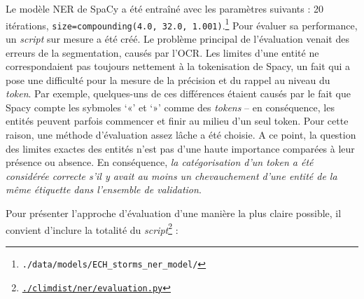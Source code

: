 \documentclass[a4paper,twoside,12pt]{article}
\begin{document}
Le modèle NER de SpaCy a été entraîné avec les paramètres suivants : 20 itérations, \texttt{size=compounding(4.0, 32.0, 1.001)}.\footnote{\texttt{./data/models/ECH\_storms\_ner\_model/}} Pour évaluer sa performance, un \textit{script} sur mesure a été créé. Le problème principal de l’évaluation venait des erreurs de la segmentation, causés par l’OCR. Les limites d’une entité ne correspondaient pas toujours nettement à la tokenisation de Spacy, un fait qui a pose une difficulté pour la mesure de la précision et du rappel au niveau du \textit{token}. Par exemple, quelques-uns de ces différences étaient causés par le fait que Spacy compte les sybmoles ‘«’ et ‘»’ comme des \textit{tokens} – en conséquence, les entités peuvent parfois commencer et finir au milieu d’un seul token.
Pour cette raison, une méthode d’évaluation assez lâche a été choisie. A ce point, la question des limites exactes des entités n’est pas d’une haute importance comparées à leur présence ou absence. En conséquence, \textit{la catégorisation d'un \textit{token} a été considérée correcte s'il y avait au moins un chevauchement d'une entité de la même étiquette dans l'ensemble de validation}.

Pour présenter l'approche d'évaluation d'une manière la plus claire possible, il convient d'inclure la totalité du \textit{script}\footnote{\href{https://github.com/krkryger/clim-dist/blob/main/climdist/ner/evaluation.py}{\texttt{./climdist/ner/evaluation.py}}} :
\end{document}

